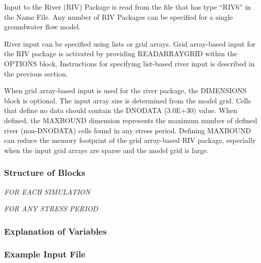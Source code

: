 Input to the River (RIV) Package is read from the file that has type ``RIV6'' in the Name File.  Any number of RIV Packages can be specified for a single groundwater flow model.

River input can be specified using lists or grid arrays.  Grid array-based input for the RIV package is activated by providing READARRAYGRID within the OPTIONS block.  Instructions for specifying list-based river input is described in the previous section.

When grid array-based input is used for the river package, the DIMENSIONS block is optional.  The input array size is determined from the model grid.  Cells that define no data should contain the DNODATA (3.0E+30) value.  When defined, the MAXBOUND dimension represents the maximum number of defined river (non-DNODATA) cells found in any stress period.  Defining MAXBOUND can reduce the memory footprint of the grid array-based RIV package, especially when the input grid arrays are sparse and the model grid is large.

\vspace{5mm}
\subsubsection{Structure of Blocks}
\vspace{5mm}

\noindent \textit{FOR EACH SIMULATION}


\vspace{5mm}
\noindent \textit{FOR ANY STRESS PERIOD}

\packageperioddescription

\vspace{5mm}
\subsubsection{Explanation of Variables}
\begin{description}

\end{description}

\vspace{5mm}
\subsubsection{Example Input File}


